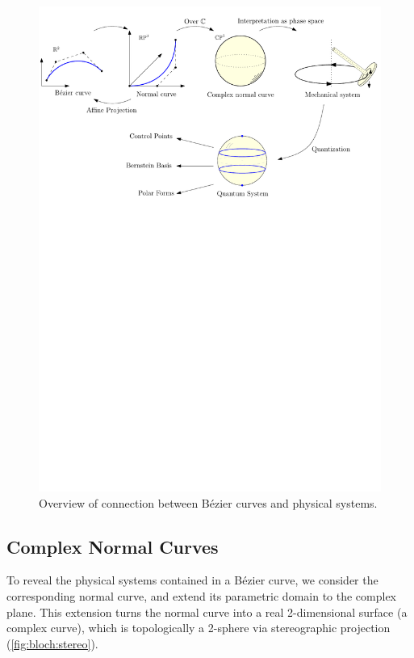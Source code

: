 \documentclass[final,3p,mathptmx]{elsarticle}
\begin{document}
\begin{figure}[h]
	\centering
	\includegraphics[width=\textwidth, keepaspectratio]{figures/outline2.pdf}
	\caption{Overview of connection between B\'{e}zier curves and physical systems.}
	\label{fig:outline}
\end{figure}

\subsection{Complex Normal Curves}\label{sec:bezier2physics:Cnormal}
To reveal the physical systems contained in a B\'{e}zier curve, we  consider the corresponding normal curve, and extend its parametric domain to the complex plane. This extension turns the normal curve into a real 2-dimensional surface (a complex curve), which is topologically a 2-sphere via stereographic projection (\autoref{fig:bloch:stereo}).
\end{document}
